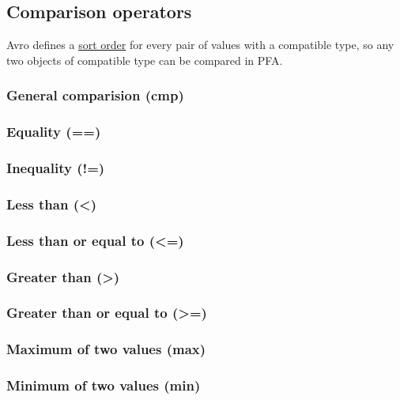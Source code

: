 \documentclass{article}
\theoremstyle{definition}
\begin{document}
\subsection{Comparison operators}

Avro defines a \href{http://avro.apache.org/docs/1.7.6/spec.html#order}{sort order} for every pair of values with a compatible type, so any two objects of compatible type can be compared in PFA.

\subsubsection{General comparision (cmp)}

\subsubsection{Equality (==)}
\libfcn{==}

\subsubsection{Inequality (!=)}
\libfcn{!=}

\subsubsection{Less than (<)}
\libfcn{<}

\subsubsection{Less than or equal to (<=)}
\libfcn{<=}

\subsubsection{Greater than (>)}
\libfcn{>}

\subsubsection{Greater than or equal to (>=)}
\libfcn{>=}

\subsubsection{Maximum of two values (max)}

\subsubsection{Minimum of two values (min)}
\end{document}
